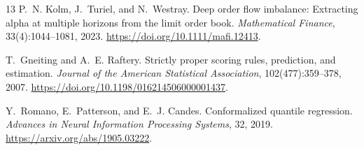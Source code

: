 \documentclass[10pt,letterpaper]{article}
\numberwithin{equation}{section}
\theoremstyle{definition}
\theoremstyle{remark}
\begin{document}
\begin{thebibliography}{13}
P.~N. Kolm, J.~Turiel, and N.~Westray.
\newblock Deep order flow imbalance: Extracting alpha at multiple horizons from
the limit order book.
\newblock \emph{Mathematical Finance}, 33(4):1044--1081, 2023.
\newblock \url{https://doi.org/10.1111/mafi.12413}.

T.~Gneiting and A.~E. Raftery.
\newblock Strictly proper scoring rules, prediction, and estimation.
\newblock \emph{Journal of the American Statistical Association},
102(477):359--378, 2007.
\newblock \url{https://doi.org/10.1198/016214506000001437}.

Y.~Romano, E.~Patterson, and E.~J. Candes.
\newblock Conformalized quantile regression.
\newblock \emph{Advances in Neural Information Processing Systems}, 32, 2019.
\newblock \url{https://arxiv.org/abs/1905.03222}.

\end{thebibliography}
\end{document}
